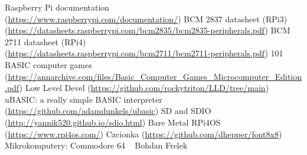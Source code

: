 \documentclass[shortabstract]{iithesis}
\begin{document}
\begin{thebibliography}{1}

\bibitem{} Raspberry Pi documentation\\(\url{https://www.raspberrypi.com/documentation/})
\bibitem{} BCM 2837 datasheet (RPi3)\\(\url{https://datasheets.raspberrypi.com/bcm2835/bcm2835-peripherals.pdf})
\bibitem{} BCM 2711 datasheet (RPi4)\\(\url{https://datasheets.raspberrypi.com/bcm2711/bcm2711-peripherals.pdf})
\bibitem{} 101 BASIC computer games\\(\url{https://annarchive.com/files/Basic_Computer_Games_Microcomputer_Edition.pdf})
\bibitem{} Low Level Devel (\url{https://github.com/rockytriton/LLD/tree/main})
\bibitem{} uBASIC: a really simple BASIC interpreter\\ (\url{https://github.com/adamdunkels/ubasic})
\bibitem{} SD and SDIO (\url{http://yannik520.github.io/sdio.html})
\bibitem{} Bare Metal RPi4OS (\url{https://www.rpi4os.com/})
\bibitem{} Czcionka (\url{https://github.com/dhepper/font8x8})
\bibitem{} Mikrokomputery: Commodore 64 ~ Bohdan Frelek

\end{thebibliography}
\end{document}
